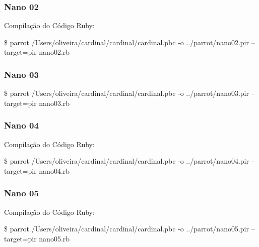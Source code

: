 \documentclass[12pt,a4paper,twoside]{report}
\begin{document}
\subsubsection{Nano 02}


Compilação do Código Ruby:
\begin{terminal}
\$ parrot /Users/oliveira/cardinal/cardinal/cardinal.pbc -o
../parrot/nano02.pir --target=pir nano02.rb
\end{terminal}


\subsubsection{Nano 03}


\begin{terminal}
\$ parrot /Users/oliveira/cardinal/cardinal/cardinal.pbc -o
../parrot/nano03.pir --target=pir nano03.rb
\end{terminal}


\subsubsection{Nano 04}


Compilação do Código Ruby:
\begin{terminal}
\$ parrot /Users/oliveira/cardinal/cardinal/cardinal.pbc -o
../parrot/nano04.pir --target=pir nano04.rb
\end{terminal}


\subsubsection{Nano 05}


Compilação do Código Ruby:
\begin{terminal}
\$ parrot /Users/oliveira/cardinal/cardinal/cardinal.pbc -o
../parrot/nano05.pir --target=pir nano05.rb
\end{terminal}

\end{document}
